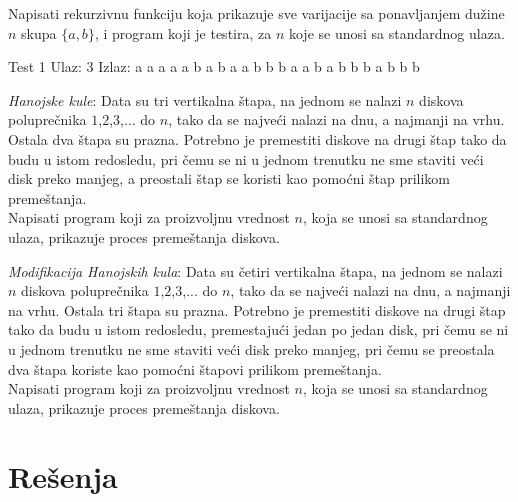 \begin{Exercise}[label=116]%
Napisati rekurzivnu funkciju koja prikazuje sve varijacije sa
   ponavljanjem dužine $n$ skupa $\{a, b\}$, i program koji je
   testira, za $n$ koje se unosi sa standardnog ulaza.

\begin{miditest}
\begin{test}{Test 1}
Ulaz:    3
Izlaz:   a a a
         a a b
         a b a
         a b b
         b a a
         b a b
         b b a
         b b b
\end{test}
\end{miditest}
\end{Exercise}

\begin{Exercise}[label=117]%
{\em Hanojske kule}: Data su tri
  vertikalna štapa, na jednom se nalazi $n$ diskova poluprečnika
  $1$,$2$,$3$,... do $n$, tako da se najveći nalazi na dnu, a
  najmanji na vrhu. Ostala dva štapa su prazna. Potrebno je
  premestiti diskove na drugi štap tako da budu u istom redosledu, pri čemu se ni u jednom
  trenutku ne sme staviti veći disk preko manjeg, a preostali štap se koristi kao pomoćni štap prilikom
  premeštanja. \\
  Napisati program koji za proizvoljnu vrednost $n$, koja se unosi sa standardnog ulaza, prikazuje proces premeštanja diskova.

\end{Exercise}

\begin{Exercise}[label=118]%
{\em Modifikacija Hanojskih kula}: Data su četiri
  vertikalna štapa, na jednom se nalazi $n$ diskova poluprečnika
  $1$,$2$,$3$,... do $n$, tako da se najveći nalazi na dnu, a
  najmanji na vrhu. Ostala tri štapa su prazna. Potrebno je
  premestiti diskove na drugi štap tako da budu u istom redosledu,
  premestajući jedan po jedan disk, pri čemu se ni u jednom
  trenutku ne sme staviti veći disk preko manjeg, pri čemu se
  preostala dva štapa koriste kao pomoćni štapovi prilikom
  premeštanja.\\
  Napisati program koji za proizvoljnu vrednost $n$, koja se unosi sa standardnog ulaza, prikazuje proces premeštanja diskova.

\end{Exercise}



\section{Rešenja}
\shipoutAnswer
